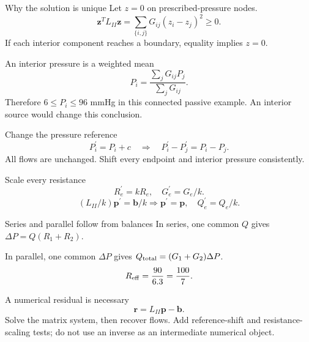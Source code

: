 \documentclass[aspectratio=169,11pt]{beamer}
\newcommand{\notestarget}{notes.pdf}\newcommand{\noteslabel}{Notes}
\begin{document}
\renewcommand{\notestarget}{notes.pdf\#note-the-conductance-matrix-and-a-uniqueness-argument}
\begin{frame}[t,fragile,label=slide-why-the-solution-is-unique]{Why the solution is unique}
Let $z=0$ on prescribed-pressure nodes.\[\mathbf z^TL_{II}\mathbf z=\sum_{\{i,j\}}G_{ij}(z_i-z_j)^2\geq0.\]\pause{} If each interior component reaches a boundary, equality implies $z=0$.
\end{frame}
\renewcommand{\notestarget}{notes.pdf\#note-the-conductance-matrix-and-a-uniqueness-argument}
\begin{frame}[t,fragile,label=slide-an-interior-pressure-is-a-weighted-mean]{An interior pressure is a weighted mean}
\[P_i=\frac{\sum_jG_{ij}P_j}{\sum_jG_{ij}}.\]\pause{} Therefore $6\leq P_i\leq96$ mmHg in this connected passive example. An interior source would change this conclusion.
\end{frame}
\renewcommand{\notestarget}{notes.pdf\#note-transformations-that-expose-errors}
\begin{frame}[t,fragile,label=slide-change-the-pressure-reference]{Change the pressure reference}
\[P_i^{\prime}=P_i+c\quad\Rightarrow\quad P_i^{\prime}-P_j^{\prime}=P_i-P_j.\]\pause{} All flows are unchanged. Shift every endpoint and interior pressure consistently.
\end{frame}
\renewcommand{\notestarget}{notes.pdf\#note-transformations-that-expose-errors}
\begin{frame}[t,fragile,label=slide-scale-every-resistance]{Scale every resistance}
\[R_e^{\prime}=kR_e,\quad G_e^{\prime}=G_e/k.\]\pause{}\[(L_{II}/k)\mathbf p^{\prime}=\mathbf b/k\Rightarrow\mathbf p^{\prime}=\mathbf p,\quad Q_e^{\prime}=Q_e/k.\]
\end{frame}
\renewcommand{\notestarget}{notes.pdf\#note-transformations-that-expose-errors}
\begin{frame}[t,fragile,label=slide-series-and-parallel-follow-from-balances]{Series and parallel follow from balances}
In series, one common $Q$ gives $\Delta P=Q(R_1+R_2)$.\pause{}\par In parallel, one common $\Delta P$ gives $Q_{\rm total}=(G_1+G_2)\Delta P$.\pause{}\[R_{\rm eff}=\frac{90}{6.3}=\frac{100}{7}.\]
\end{frame}
\renewcommand{\notestarget}{notes.pdf\#note-computational-residuals-and-the-scope-of-a-claim}
\begin{frame}[t,fragile,label=slide-a-numerical-residual-is-necessary]{A numerical residual is necessary}
\[\mathbf r=L_{II}\mathbf p-\mathbf b.\]\pause{} Solve the matrix system, then recover flows. Add reference-shift and resistance-scaling tests; do not use an inverse as an intermediate numerical object.
\end{frame}
\end{document}
